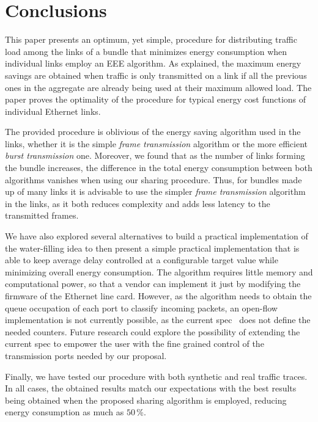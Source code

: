\documentclass[journal,english,twocolumn,10pt,letterpaper]{IEEEtran}
\newcommand{\added}[1]{{#1}}
\begin{document}
\section{Conclusions}
\label{sec:conclusions}

This paper presents an optimum, yet simple, procedure for distributing traffic
load among the links of a bundle that minimizes energy consumption when
individual links employ an EEE algorithm. As explained, the maximum energy
savings are obtained when traffic is only transmitted on a link if all the
previous ones in the aggregate are already being used at their maximum allowed
load. The paper proves the optimality of the procedure for typical energy cost
functions of individual Ethernet links.

The provided procedure is oblivious of the energy saving algorithm used in the
links, whether it is the simple \emph{frame transmission} algorithm or the
more efficient \emph{burst transmission} one. Moreover, we found that as the
number of links forming the bundle increases, the difference in the total
energy consumption between both algorithms vanishes when using our sharing
procedure. Thus, for bundles made up of many links it is advisable to use the
simpler \emph{frame transmission} algorithm in the links, as it both reduces
complexity and adds less latency to the transmitted frames.

We have also explored several alternatives to build a practical implementation
of the water-filling idea to then present a simple practical implementation
that is able to keep average delay controlled at a configurable target value
while minimizing overall energy consumption. \added{The algorithm requires
  little memory and computational power, so that a vendor can implement it
  just by modifying the firmware of the Ethernet line card. However, as the
  algorithm needs to obtain the queue occupation of each port to classify
  incoming packets, an open-flow implementation is not currently possible, as
  the current spec~\cite{foundation13:_openf_switc_specif} does not define the
  needed counters. Future research could explore the possibility of extending
  the current spec to empower the user with the fine grained control of the
  transmission ports needed by our proposal.}

Finally, we have tested our procedure with both synthetic and real
traffic traces. In all cases, the obtained results match our expectations with
the best results being obtained when the proposed sharing algorithm is
employed, reducing energy consumption as much as $50\,$\%.
\end{document}
